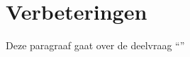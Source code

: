 \chapter{Verbeteringen}

\label{Chapter5}

Deze paragraaf gaat over de deelvraag \enquote{\deelverbetering}
